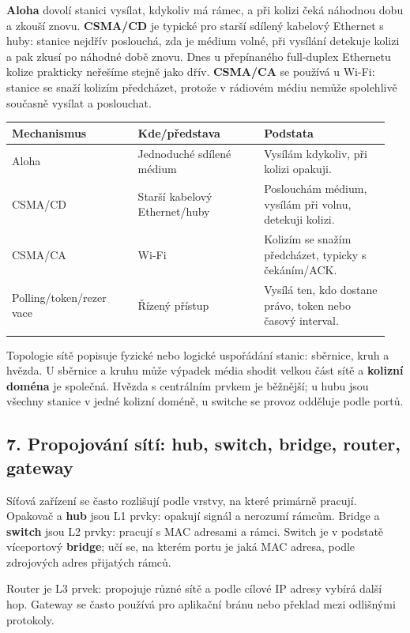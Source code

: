 \documentclass[11pt,a4paper]{article}
\begin{document}
\textbf{Aloha} dovolí stanici vysílat, kdykoliv má rámec, a při kolizi čeká náhodnou dobu a zkouší znovu. \textbf{CSMA/CD} je typické pro starší sdílený kabelový Ethernet s huby: stanice nejdřív poslouchá, zda je médium volné, při vysílání detekuje kolizi a pak zkusí po náhodné době znovu. Dnes u přepínaného full-duplex Ethernetu kolize prakticky neřešíme stejně jako dřív. \textbf{CSMA/CA} se používá u Wi-Fi: stanice se snaží kolizím předcházet, protože v rádiovém médiu nemůže spolehlivě současně vysílat a poslouchat.

\begin{longtable}{p{0.317\linewidth}p{0.317\linewidth}p{0.317\linewidth}}
\toprule
\textbf{Mechanismus} & \textbf{Kde/představa} & \textbf{Podstata} \\
\midrule\endhead
Aloha & Jednoduché sdílené médium & Vysílám kdykoliv, při kolizi opakuji. \\
\addlinespace
CSMA/CD & Starší kabelový Ethernet/huby & Poslouchám médium, vysílám při volnu, detekuji kolizi. \\
\addlinespace
CSMA/CA & Wi-Fi & Kolizím se snažím předcházet, typicky s čekáním/ACK. \\
\addlinespace
Polling/token/rezer vace & Řízený přístup & Vysílá ten, kdo dostane právo, token nebo časový interval. \\
\addlinespace
\bottomrule
\end{longtable}

Topologie sítě popisuje fyzické nebo logické uspořádání stanic: sběrnice, kruh a hvězda. U sběrnice a kruhu může výpadek média shodit velkou část sítě a \textbf{kolizní doména} je společná. Hvězda s centrálním prvkem je běžnější; u hubu jsou všechny stanice v jedné kolizní doméně, u switche se provoz odděluje podle portů.

\subsection*{7. Propojování sítí: hub, switch, bridge, router, gateway}

Síťová zařízení se často rozlišují podle vrstvy, na které primárně pracují. Opakovač a \textbf{hub} jsou L1 prvky: opakují signál a nerozumí rámcům. Bridge a \textbf{switch} jsou L2 prvky: pracují s MAC adresami a rámci. Switch je v podstatě víceportový \textbf{bridge}; učí se, na kterém portu je jaká MAC adresa, podle zdrojových adres přijatých rámců.

Router je L3 prvek: propojuje různé sítě a podle cílové IP adresy vybírá další hop. Gateway se často používá pro aplikační bránu nebo překlad mezi odlišnými protokoly.
\end{document}
